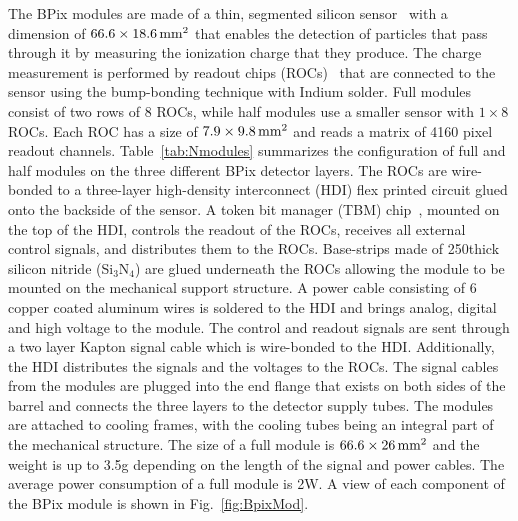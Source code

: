 The BPix modules are made of a thin, segmented silicon sensor~\cite{Allkofer200825} with a dimension of $66.6\times18.6\,\text{mm}^2$ that enables the detection of particles that pass through it by measuring the ionization charge that they produce.
The charge measurement is performed by readout chips (ROCs)~\cite{Kastli:2005jj} that are connected to the sensor using the bump-bonding technique with Indium solder.
Full modules consist of two rows of 8 ROCs, while half modules use a smaller sensor with $1\times8$ ROCs.
Each ROC has a size of $7.9\times9.8\,\text{mm}^2$ and reads a matrix of 4160 pixel readout channels.
Table~\ref{tab:Nmodules} summarizes the configuration of full and half modules on the three different BPix detector layers.
The ROCs are wire-bonded to a three-layer high-density interconnect (HDI) flex printed circuit glued onto the backside of the sensor.
A token bit manager (TBM) chip~\cite{Bartz:920426}, mounted on the top of the HDI, controls the readout of the ROCs, receives all external control signals, and distributes them to the ROCs.
Base-strips made of 250\mum thick silicon nitride (Si$_3$N$_4$) are glued underneath the ROCs allowing the module to be mounted on the mechanical support structure.
A power cable consisting of 6 copper coated aluminum wires is soldered to the HDI and brings analog, digital and high voltage to the module.
The control and readout signals are sent through a two layer Kapton signal cable which is wire-bonded to the HDI.
Additionally, the HDI distributes the signals and the voltages to the ROCs.
The signal cables from the modules are plugged into the end flange that exists on both sides of the barrel and connects the three layers to the detector supply tubes. 
The modules are attached to cooling frames, with the cooling tubes being an integral part of the mechanical structure.
The size of a full module is $66.6\times26\,\text{mm}^2$ and the weight is up to 3.5\unit{g} depending on the length of the signal and power cables.
The average power consumption of a full module is 2\unit{W}. A view of each component of the BPix module is shown in Fig.~\ref{fig:BpixMod}.

